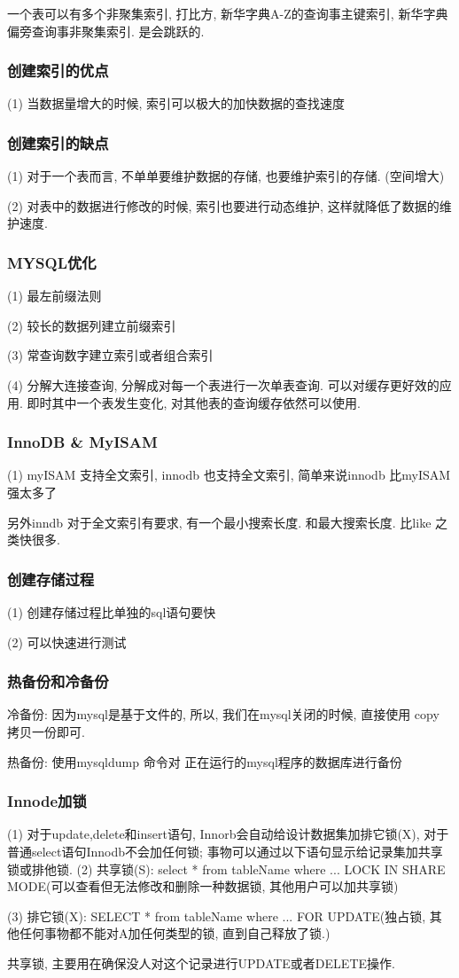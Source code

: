 一个表可以有多个非聚集索引, 打比方, 新华字典A-Z的查询事主键索引, 新华字典偏旁查询事非聚集索引. 是会跳跃的.


\subsubsection{创建索引的优点}
(1) 当数据量增大的时候, 索引可以极大的加快数据的查找速度
\subsubsection{创建索引的缺点}
(1) 对于一个表而言, 不单单要维护数据的存储, 也要维护索引的存储. (空间增大)
\par
(2) 对表中的数据进行修改的时候, 索引也要进行动态维护, 这样就降低了数据的维护速度.
\subsubsection{MYSQL优化}
(1) 最左前缀法则 \par
(2) 较长的数据列建立前缀索引 \par
(3) 常查询数字建立索引或者组合索引 \par
(4) 分解大连接查询, 分解成对每一个表进行一次单表查询. 可以对缓存更好效的应用. 即时其中一个表发生变化, 对其他表的查询缓存依然可以使用.
\subsubsection{InnoDB \& MyISAM}
(1) myISAM 支持全文索引, innodb 也支持全文索引, 简单来说innodb 比myISAM强太多了\par
另外inndb 对于全文索引有要求, 有一个最小搜索长度. 和最大搜索长度. 比like 之类快很多.
\subsubsection{创建存储过程}
(1) 创建存储过程比单独的sql语句要快\par
(2) 可以快速进行测试
\subsubsection{热备份和冷备份}
冷备份: 因为mysql是基于文件的, 所以, 我们在mysql关闭的时候, 直接使用 copy 拷贝一份即可. \par
热备份: 使用mysqldump 命令对 正在运行的mysql程序的数据库进行备份
\subsubsection{Innode加锁}
(1) 对于update,delete和insert语句, Innorb会自动给设计数据集加排它锁(X), 对于普通select语句Innodb不会加任何锁; 事物可以通过以下语句显示给记录集加共享锁或排他锁.
(2) 共享锁(S): select * from tableName where ... LOCK IN SHARE MODE(可以查看但无法修改和删除一种数据锁, 其他用户可以加共享锁) \par
(3) 排它锁(X): SELECT * from tableName where ... FOR UPDATE(独占锁, 其他任何事物都不能对A加任何类型的锁, 直到自己释放了锁.) \par
共享锁, 主要用在确保没人对这个记录进行UPDATE或者DELETE操作.
